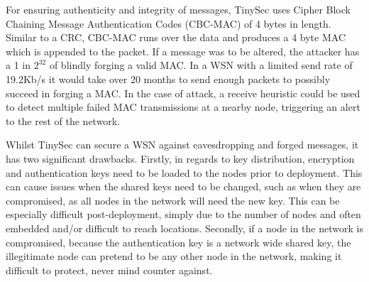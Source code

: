 For ensuring authenticity and integrity of messages, TinySec uses Cipher Block Chaining Message Authentication Codes (CBC-MAC) of 4 bytes in length. Similar to a CRC, CBC-MAC runs over the data and produces a 4 byte MAC which is appended to the packet. If a message was to be altered, the attacker has a 1 in $2^{32}$ of blindly forging a valid MAC. In a WSN with a limited send rate of 19.2Kb/s it would take over 20 months to send enough packets to possibly succeed in forging a MAC. In the case of attack, a receive heuristic could be used to detect multiple failed MAC transmissions at a nearby node, triggering an alert to the rest of the network.

Whilst TinySec can secure a WSN against eavesdropping and forged messages, it has two significant drawbacks. Firstly, in regards to key distribution, encryption and authentication keys need to be loaded to the nodes prior to deployment. This can cause issues when the shared keys need to be changed, such as when they are compromised, as all nodes in the network will need the new key. This can be especially difficult post-deployment, simply due to the number of nodes and often embedded and/or difficult to reach locations. Secondly, if a node in the network is compromised, because the authentication key is a network wide shared key, the illegitimate node can pretend to be any other node in the network, making it difficult to protect, never mind counter against.